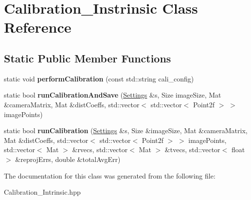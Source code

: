\hypertarget{class_calibration___instrinsic}{}\section{Calibration\+\_\+\+Instrinsic Class Reference}
\label{class_calibration___instrinsic}
\subsection*{Static Public Member Functions}
\begin{DoxyCompactItemize}
\item 
\mbox{\label{class_calibration___instrinsic_a65d585bbfe48d2c1cedbc0f1b43b05d5}} 
static void {\bfseries perform\+Calibration} (const std\+::string cali\+\_\+config)
\item 
\mbox{\label{class_calibration___instrinsic_aa8de03a03a709d52c9ac4e076e99072e}} 
static bool {\bfseries run\+Calibration\+And\+Save} (\mbox{\hyperlink{class_settings}{Settings}} \&s, Size image\+Size, Mat \&camera\+Matrix, Mat \&dist\+Coeffs, std\+::vector$<$ std\+::vector$<$ Point2f $>$ $>$ image\+Points)
\item 
\mbox{\label{class_calibration___instrinsic_aec65e62022a78dd3c200ab613d4e1256}} 
static bool {\bfseries run\+Calibration} (\mbox{\hyperlink{class_settings}{Settings}} \&s, Size \&image\+Size, Mat \&camera\+Matrix, Mat \&dist\+Coeffs, std\+::vector$<$ std\+::vector$<$ Point2f $>$ $>$ image\+Points, std\+::vector$<$ Mat $>$ \&rvecs, std\+::vector$<$ Mat $>$ \&tvecs, std\+::vector$<$ float $>$ \&reproj\+Errs, double \&total\+Avg\+Err)
\end{DoxyCompactItemize}


The documentation for this class was generated from the following file\+:\begin{DoxyCompactItemize}
\item 
Calibration\+\_\+\+Intrinsic.\+hpp\end{DoxyCompactItemize}
